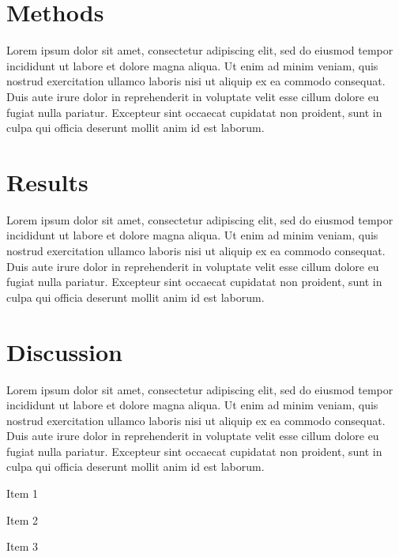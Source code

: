 \documentclass[nogrid]{MBE}%
\begin{document}
\section{{Methods}\label{sec:Methods}}

Lorem ipsum dolor sit amet, consectetur adipiscing elit, sed do eiusmod tempor incididunt ut labore et dolore magna aliqua. Ut enim ad minim veniam, quis nostrud exercitation ullamco laboris nisi ut aliquip ex ea commodo consequat. Duis aute irure dolor in reprehenderit in voluptate velit esse cillum dolore eu fugiat nulla pariatur. Excepteur sint occaecat cupidatat non proident, sunt in culpa qui officia deserunt mollit anim id est laborum.

\section{{Results}\label{sec:Results}}

Lorem ipsum dolor sit amet, consectetur adipiscing elit, sed do eiusmod tempor incididunt ut labore et dolore magna aliqua. Ut enim ad minim veniam, quis nostrud exercitation ullamco laboris nisi ut aliquip ex ea commodo consequat. Duis aute irure dolor in reprehenderit in voluptate velit esse cillum dolore eu fugiat nulla pariatur. Excepteur sint occaecat cupidatat non proident, sunt in culpa qui officia deserunt mollit anim id est laborum.

\section{{Discussion}\label{sec:Discussion}}

Lorem ipsum dolor sit amet, consectetur adipiscing elit, sed do eiusmod tempor incididunt ut labore et dolore magna aliqua. Ut enim ad minim veniam, quis nostrud exercitation ullamco laboris nisi ut aliquip ex ea commodo consequat. Duis aute irure dolor in reprehenderit in voluptate velit esse cillum dolore eu fugiat nulla pariatur. Excepteur sint occaecat cupidatat non proident, sunt in culpa qui officia deserunt mollit anim id est laborum.

\begin{arabiclist}
\item Item 1

\item Item 2

\item Item 3
\end{arabiclist}
\end{document}
